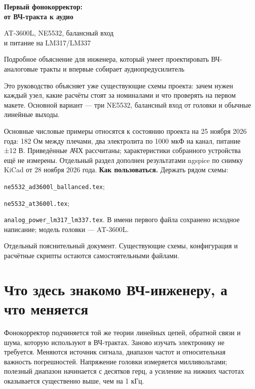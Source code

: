 \documentclass[a4paper,11pt]{article}
\newcommand{\file}[1]{\nolinkurl{#1}}
\begin{document}
\hypersetup{pageanchor=false}
\begin{titlepage}
\vspace*{17mm}
{\Huge\bfseries Первый фонокорректор:\\[3mm]от ВЧ-тракта к аудио\par}
\vspace{8mm}
{\Large AT-3600L, NE5532, балансный вход\\и питание на LM317/LM337\par}
\vspace{15mm}
{\large Подробное объяснение для инженера, который умеет проектировать
ВЧ-аналоговые тракты и впервые собирает аудиопредусилитель\par}
\vspace{9mm}
Это руководство объясняет уже существующие схемы проекта: зачем нужен каждый
узел, какие расчёты стоят за номиналами и что проверять на первом макете.
Основной вариант — три NE5532, балансный вход от головки и обычные линейные выходы.

Основные числовые примеры относятся к состоянию проекта на 25 ноября 2026 года:
182 Ом между плечами, два электролита по 1000 мкФ на канал, питание ±12 В.
Приведённые АЧХ рассчитаны; характеристики собранного устройства ещё не измерены.
Отдельный раздел дополнен результатами ngspice по снимку KiCad от 28 ноября 2026 года.
\vfill
\textbf{Как пользоваться.} Держать рядом схемы:\par
\file{ne5532_ad3600l_ballanced.tex};\par
\file{ne5532_at3600l.tex};\par
\file{analog_power_lm317_lm337.tex}.
В имени первого файла сохранено исходное написание; модель головки — AT-3600L.
\par\vspace{5mm}
Отдельный пояснительный документ. Существующие схемы, конфигурация и расчётные
скрипты остаются самостоятельными файлами.
\end{titlepage}
\hypersetup{pageanchor=true}

\tableofcontents
\newpage

\section{Что здесь знакомо ВЧ-инженеру, а что меняется}

Фонокорректор подчиняется той же теории линейных цепей, обратной связи и шума,
которую используют в ВЧ-трактах. Заново изучать электронику не требуется.
Меняются источник сигнала, диапазон частот и относительная важность погрешностей.
Напряжение головки измеряется милливольтами; полезный диапазон начинается с десятков
герц, а усиление на нижних частотах оказывается существенно выше, чем на 1 кГц.
\end{document}
